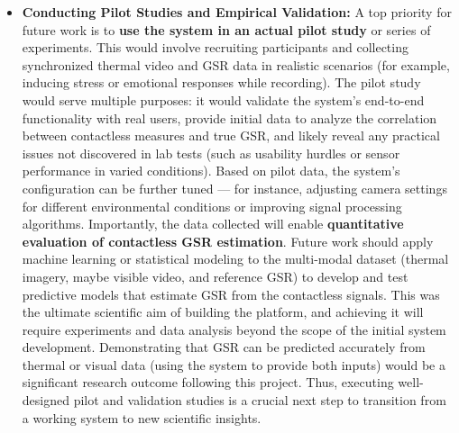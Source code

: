 \documentclass[11pt,a4paper]{report}
\begin{document}
\begin{itemize}
\item \textbf{Conducting Pilot Studies and Empirical Validation:} A top priority
  for future work is to \textbf{use the system in an actual pilot study} or
  series of experiments. This would involve recruiting participants and
  collecting synchronized thermal video and GSR data in realistic
  scenarios (for example, inducing stress or emotional responses while
  recording). The pilot study would serve multiple purposes: it would
  validate the system's end-to-end functionality with real users,
  provide initial data to analyze the correlation between contactless
  measures and true GSR, and likely reveal any practical issues not
  discovered in lab tests (such as usability hurdles or sensor
  performance in varied conditions). Based on pilot data, the system's
  configuration can be further tuned --- for instance, adjusting camera
  settings for different environmental conditions or improving signal
  processing algorithms. Importantly, the data collected will enable
  \textbf{quantitative evaluation of contactless GSR estimation}. Future work
  should apply machine learning or statistical modeling to the
  multi-modal dataset (thermal imagery, maybe visible video, and
  reference GSR) to develop and test predictive models that estimate GSR
  from the contactless signals. This was the ultimate scientific aim of
  building the platform, and achieving it will require experiments and
  data analysis beyond the scope of the initial system development.
  Demonstrating that GSR can be predicted accurately from thermal or
  visual data (using the system to provide both inputs) would be a
  significant research outcome following this project. Thus, executing
  well-designed pilot and validation studies is a crucial next step to
  transition from a working system to new scientific insights.


\end{itemize}
\end{document}
